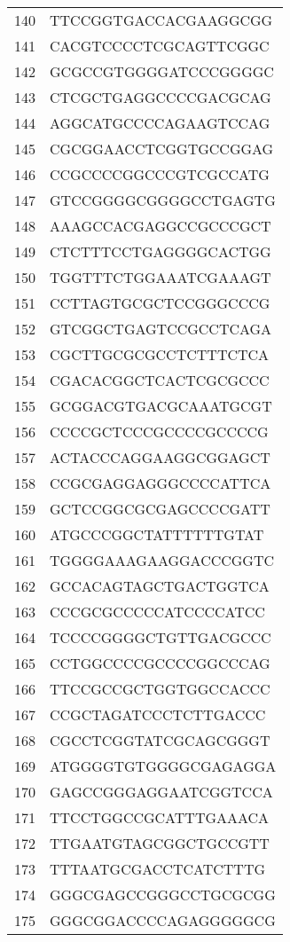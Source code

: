 \documentclass[letterpaper,12pt]{article}
\numberwithin{equation}{appendix}
\begin{document}
{{\begin{table}[ht]
\begin{tabular}{rl}
  140 & TTCCGGTGACCACGAAGGCGG \\ 
  141 & CACGTCCCCTCGCAGTTCGGC \\ 
  142 & GCGCCGTGGGGATCCCGGGGC \\ 
  143 & CTCGCTGAGGCCCCGACGCAG \\ 
  144 & AGGCATGCCCCAGAAGTCCAG \\ 
  145 & CGCGGAACCTCGGTGCCGGAG \\ 
  146 & CCGCCCCGGCCCGTCGCCATG \\ 
  147 & GTCCGGGGCGGGGCCTGAGTG \\ 
  148 & AAAGCCACGAGGCCGCCCGCT \\ 
  149 & CTCTTTCCTGAGGGGCACTGG \\ 
  150 & TGGTTTCTGGAAATCGAAAGT \\ 
  151 & CCTTAGTGCGCTCCGGGCCCG \\ 
  152 & GTCGGCTGAGTCCGCCTCAGA \\ 
  153 & CGCTTGCGCGCCTCTTTCTCA \\ 
  154 & CGACACGGCTCACTCGCGCCC \\ 
  155 & GCGGACGTGACGCAAATGCGT \\ 
  156 & CCCCGCTCCCGCCCCGCCCCG \\ 
  157 & ACTACCCAGGAAGGCGGAGCT \\ 
  158 & CCGCGAGGAGGGCCCCATTCA \\ 
  159 & GCTCCGGCGCGAGCCCCGATT \\ 
  160 & ATGCCCGGCTATTTTTTGTAT \\ 
  161 & TGGGGAAAGAAGGACCCGGTC \\ 
  162 & GCCACAGTAGCTGACTGGTCA \\ 
  163 & CCCGCGCCCCCATCCCCATCC \\ 
  164 & TCCCCGGGGCTGTTGACGCCC \\ 
  165 & CCTGGCCCCGCCCCGGCCCAG \\ 
  166 & TTCCGCCGCTGGTGGCCACCC \\ 
  167 & CCGCTAGATCCCTCTTGACCC \\ 
  168 & CGCCTCGGTATCGCAGCGGGT \\ 
  169 & ATGGGGTGTGGGGCGAGAGGA \\ 
  170 & GAGCCGGGAGGAATCGGTCCA \\ 
  171 & TTCCTGGCCGCATTTGAAACA \\ 
  172 & TTGAATGTAGCGGCTGCCGTT \\ 
  173 & TTTAATGCGACCTCATCTTTG \\ 
  174 & GGGCGAGCCGGGCCTGCGCGG \\ 
  175 & GGGCGGACCCCAGAGGGGGCG \\ 

\end{tabular}
\end{table}}}
\end{document}
